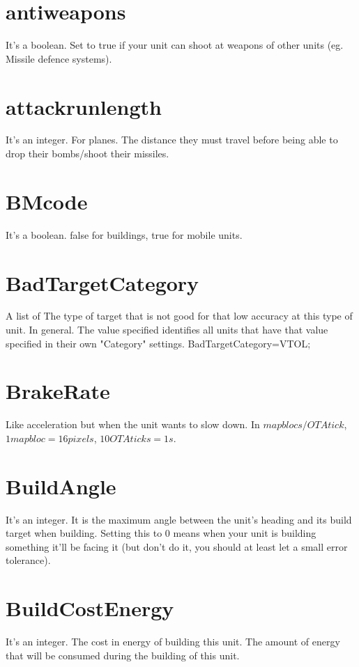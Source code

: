 \documentclass[a4paper,10pt]{article}
\begin{document}
\section{antiweapons}
It's a boolean. Set to true if your unit can shoot at weapons of other units (eg. Missile defence systems).

\section{attackrunlength}
It's an integer.
For planes. The distance they must travel before being able to drop their bombs/shoot their missiles.

\section{BMcode}
It's a boolean. false for buildings, true for mobile units.

\section{BadTargetCategory}
A list of 
The type of target that is not good for that low accuracy at this type of unit. In general.  The value specified identifies all units that have that value specified in their own "Category" settings. 	BadTargetCategory=VTOL;

\section{BrakeRate}
Like acceleration but when the unit wants to slow down. In $map blocs/OTA tick$, $1 map bloc = 16 pixels$, $10 OTA ticks = 1s$.

\section{BuildAngle}
It's an integer. It is the maximum angle between the unit's heading and its build target when building. Setting this to 0 means when your unit is building something it'll be facing it (but don't do it, you should at least let a small error tolerance).

\section{BuildCostEnergy}
It's an integer. The cost in energy of building this unit. The amount of energy that will be consumed during the building of this unit.
\end{document}
